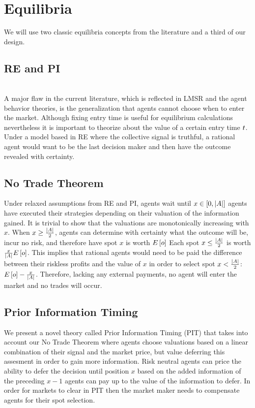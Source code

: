 \section{Equilibria}
We will use two classic equilibria concepts from the literature and a third of our design. 

\subsection{RE and PI}
 \\

A major flaw in the current literature, which is reflected in LMSR and the agent behavior theories, is the generalization that agents cannot choose when to enter the market. Although fixing entry time is useful for equilibrium calculations nevertheless it is important to theorize about the value of a certain entry time $t$. Under a model based in RE where the collective signal is truthful, a rational agent would want to be the last decision maker and then have the outcome revealed with certainty.\\

\subsection{No Trade Theorem}
Under relaxed assumptions from RE and PI, agents wait until $x \in \left[0, |A| \right]$ agents have executed
their strategies depending on their valuation of the information gained. It is trivial to show that 
the valuations are monotonically increasing with $x$. When $x \geq \frac{|A|}{2}$, agents can 
determine with certainty what the outcome will be, incur no risk, and therefore
have spot $x$ is worth $E\left[o\right]$
Each spot  $x \leq \frac{|A|}{2}$ is worth $\frac{x}{|A|} 
E\left[o\right]$. This implies that rational agents
would need to be paid the difference between their riskless profits and the value of $x$ in order to select spot $x < \frac{|A|}{2}$: $E\left[o\right] - \frac{x}{|A|}$. Therefore, lacking any external payments, no agent will enter the market and no
trades will occur.

\subsection{Prior Information Timing}
We present a novel theory called Prior Information Timing (PIT) that takes into account our No Trade
Theorem where agents choose valuations based on a linear combination of their signal and the market
price, but value deferring this assesment in order to gain more information. Risk neutral agents can
price the ability to defer the decision until position $x$ based on the added information of the 
preceding $x-1$ agents can pay up to the value of the information to defer. In order for markets
to clear in PIT then the market maker needs to compensate agents for their spot selection.\\

